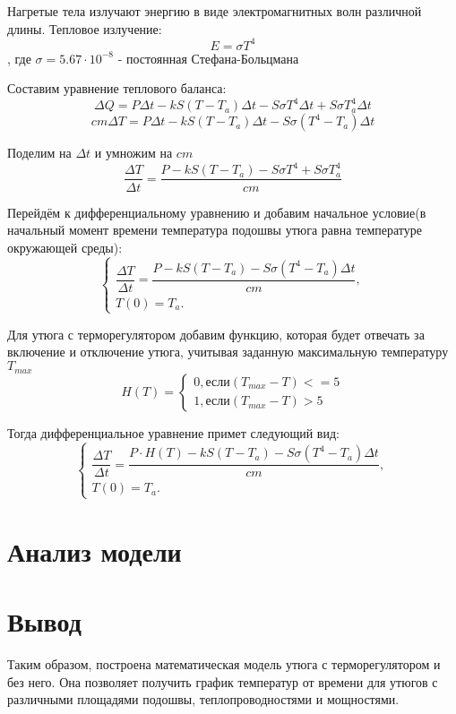 \documentclass[a4paper, 14pt]{extarticle}
\begin{document}
		Нагретые тела излучают энергию в виде электромагнитных волн различной длины. Тепловое излучение:
		\[ E = \sigma T^4 \]
		, где \( \sigma = 5.67 \cdot 10^{-8} \) - постоянная Стефана-Больцмана
		
		Составим уравнение теплового баланса:
		\[ \Delta Q = P\Delta t - kS(T-T_a) \Delta t - S \sigma T^4 \Delta t +  S \sigma T_a^4 \Delta t\]
		\[ cm \Delta T = P\Delta t - kS(T-T_a) \Delta t - S \sigma (T^4 - T_a) \Delta t \]
		
		Поделим на \( \Delta t\) и умножим на \(cm\)
		\[ \dfrac{\Delta T}{\Delta t} 
		= \dfrac{P - kS(T-T_a) - S \sigma T^4 +  S \sigma T_a^4}{cm}\]
		
		Перейдём к дифференциальному уравнению и добавим начальное условие(в начальный момент времени
		температура подошвы утюга равна температуре окружающей среды):
		\[
			\begin{cases}
				\dfrac{\Delta T}{\Delta t} = \dfrac{P - kS(T-T_a) - S \sigma (T^4 - T_a) \Delta t}{cm},\\
				T(0) = T_a.
			\end{cases}
		\]
		
		Для утюга с терморегулятором добавим функцию, которая будет отвечать за включение и отключение утюга,
		учитывая заданную максимальную температуру \( T_{max} \)
		\[ H(T) = 
			\begin{cases}
				0, \text{если} (T_{max} - T) <= 5\\
				1, \text{если} (T_{max} - T) > 5
			\end{cases} 
		\]
		
		Тогда дифференциальное уравнение примет следующий вид:
		\[
		\begin{cases}
			\dfrac{\Delta T}{\Delta t} = \dfrac{ P\cdot H(T) - kS(T-T_a) - S \sigma (T^4 - T_a) \Delta t}{cm},\\
			T(0) = T_a.
		\end{cases}
		\]
	
	\section{Анализ модели}
	
	\section{Вывод}
		Таким образом, построена математическая модель утюга с терморегулятором и без него. Она позволяет получить график температур от времени для утюгов с различными площадями подошвы, теплопроводностями и мощностями. 
		
\end{document}
